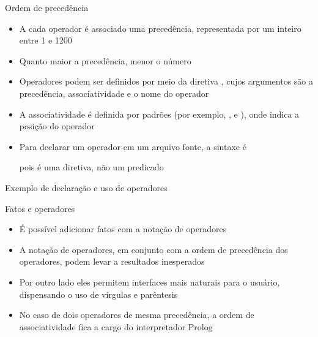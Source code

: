 \begin{frame}[fragile]{Ordem de precedência}

    \begin{itemize}
        \item A cada operador é associado uma precedência, representada por um inteiro entre 1 
            e 1200

        \item Quanto maior a precedência, menor o número

        \item Operadores podem ser definidos por meio da diretiva , cujos 
            argumentos são a precedência, associatividade e o nome do operador

        \item A associatividade é definida por padrões (por exemplo, ,
             e ),  onde  indica a 
            posição do operador

        \item Para declarar um operador em um arquivo fonte, a sintaxe é


        pois  é uma diretiva, não um predicado

    \end{itemize}

\end{frame}

\begin{frame}[fragile]{Exemplo de declaração e uso de operadores}
\end{frame}

\begin{frame}[fragile]{Fatos e operadores}

    \begin{itemize}
        \item É possível adicionar fatos com a notação de operadores

        \item A notação de operadores, em conjunto com a ordem de precedência dos operadores, 
            podem levar a resultados inesperados

        \item Por outro lado eles permitem interfaces mais naturais para o usuário, dispensando 
            o uso de vírgulas e parêntesis

        \item No caso de dois operadores de mesma precedência, a ordem de associatividade fica 
            a cargo do interpretador Prolog

    \end{itemize}

\end{frame}

